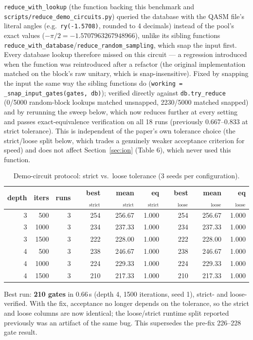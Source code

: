 \documentclass[11pt,a4paper]{article}
\begin{document}
\texttt{reduce\_with\_lookup} (the function backing this benchmark and
\texttt{scripts/reduce\_demo\_circuits.py}) queried the database with the
QASM file's literal angles (e.g.\ \texttt{ry(-1.5708)}, rounded to 4
decimals) instead of the pool's exact values ($-\pi/2 =
-1.5707963267948966$), unlike its sibling functions
\texttt{reduce\_with\_database}/\texttt{reduce\_random\_sampling}, which
snap the input first. Every database lookup therefore missed on this
circuit --- a regression introduced when the function was reintroduced
after a refactor (the original implementation matched on the block's raw
unitary, which is snap-insensitive). Fixed by snapping the input the same
way the sibling functions do (\texttt{working =
\_snap\_input\_gates(gates, db)}); verified directly against
\texttt{db.try\_reduce} (0/5000 random-block lookups matched unsnapped,
2230/5000 matched snapped) and by rerunning the sweep below, which now
reduces further at every setting and passes exact-equivalence verification
on all 18 runs (previously 0.667--0.833 at strict tolerance). This is
independent of the paper's own tolerance choice (the strict/loose split
below, which trades a genuinely weaker acceptance criterion for speed) and
does not affect Section~\ref{sec:ion} (Table 6), which never used this
function.

\begin{table}[H]
\centering
\caption{Demo-circuit protocol: strict vs.\ loose tolerance (3 seeds per
configuration).}
\label{tab:combined}
\begin{tabular}{rrrrrrrrr}
\toprule
depth & iters & runs & best$_{\text{strict}}$ & mean$_{\text{strict}}$ & eq$_{\text{strict}}$ & best$_{\text{loose}}$ & mean$_{\text{loose}}$ & eq$_{\text{loose}}$ \\
\midrule
3 & 500  & 3 & 254 & 256.67 & 1.000 & 254 & 256.67 & 1.000 \\
3 & 1000 & 3 & 234 & 237.33 & 1.000 & 234 & 237.33 & 1.000 \\
3 & 1500 & 3 & 222 & 228.00 & 1.000 & 222 & 228.00 & 1.000 \\
4 & 500  & 3 & 238 & 246.67 & 1.000 & 238 & 246.67 & 1.000 \\
4 & 1000 & 3 & 224 & 229.33 & 1.000 & 224 & 229.33 & 1.000 \\
4 & 1500 & 3 & 210 & 217.33 & 1.000 & 210 & 217.33 & 1.000 \\
\bottomrule
\end{tabular}
\end{table}

Best run: \textbf{210 gates} in 0.66\,s (depth 4, 1500 iterations, seed 1),
strict- and loose-verified. With the fix, acceptance no longer depends on
the tolerance, so the strict and loose columns are now identical; the
loose/strict runtime split reported previously was an artifact of the same
bug. This supersedes the pre-fix 226--228 gate result.
\end{document}

